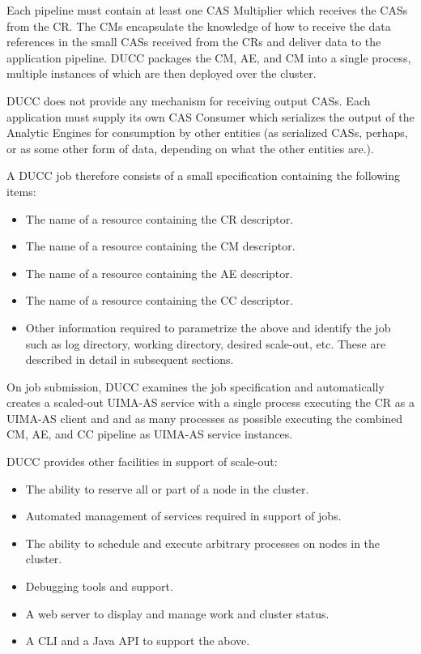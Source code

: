     Each pipeline must contain at least one CAS Multiplier which receives the CASs from the
    CR.  The CMs encapsulate the knowledge of how to receive the data references in the small
    CASs received from the CRs and deliver data to the application pipeline.  DUCC packages
    the CM, AE, and CM into a single process, multiple instances of which are then deployed
    over the cluster.

    DUCC does not provide any mechanism for receiving output CASs.  Each application must
    supply its own CAS Consumer which serializes the output of the Analytic Engines for 
    consumption by other entities (as serialized CASs, perhaps, or as some other form of
    data, depending on what the other entities are.).

    A DUCC job therefore consists of a small specification containing the following items:
    
    \begin{itemize}
      \item The name of a resource containing the CR descriptor.
      \item The name of a resource containing the CM descriptor.
      \item The name of a resource containing the AE descriptor.
      \item The name of a resource containing the CC descriptor.
      \item Other information required to parametrize the above and identify the job
        such as log directory, working directory, desired scale-out, etc.  These are
        described in detail in subsequent sections.
    \end{itemize}

    On job submission, DUCC examines the job specification and automatically creates a scaled-out
    UIMA-AS service with a single process executing the CR as a UIMA-AS client and and as many
    processes as possible executing the combined CM, AE, and CC pipeline as UIMA-AS service
    instances.

    DUCC provides other facilities in support of scale-out:
    \begin{itemize}
      \item The ability to reserve all or part of a node in the cluster.
      \item Automated management of services required in support of jobs.
      \item The ability to schedule and execute arbitrary processes on nodes in the
        cluster.
      \item Debugging tools and support.
      \item A web server to display and manage work and cluster status.
      \item A CLI and a Java API to support the above.
    \end{itemize}
    
